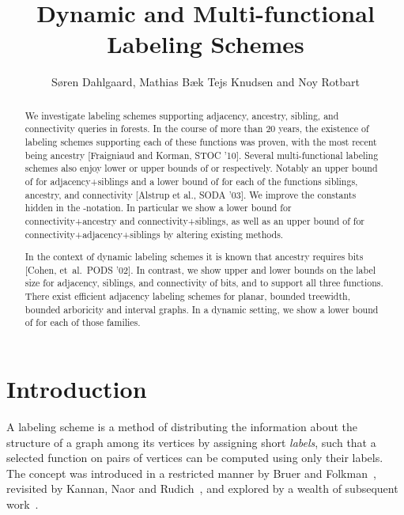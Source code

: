 \documentclass{llncs}
\begin{document}
\title{Dynamic and Multi-functional Labeling Schemes}



\author{S\o ren Dahlgaard, Mathias B\ae k Tejs Knudsen and Noy Rotbart }


\maketitle

\begin{abstract}
We investigate labeling schemes supporting  adjacency, ancestry, sibling,
and connectivity queries  in forests. 
In the course of more than 20 years, the existence of   labeling schemes supporting each of these  functions was proven, with the most recent being ancestry [Fraigniaud and Korman, STOC '10].
Several multi-functional labeling schemes also enjoy lower or upper bounds of
 or  respectively.
Notably an upper bound of  for adjacency+siblings
and a lower bound of  for each of the functions siblings, ancestry, and
connectivity [Alstrup et al., SODA '03].
We improve the constants hidden in the -notation. In particular we show a
 lower bound for connectivity+ancestry 
and connectivity+siblings, as well as an upper bound of
 for connectivity+adjacency+siblings
by altering existing methods.

In the context of dynamic labeling schemes it is known that
ancestry requires  bits [Cohen, et~al.~PODS '02]. 
In contrast, we show upper and lower bounds on the label size for adjacency, siblings, and
connectivity of  bits, and   to support all three functions.
There exist efficient adjacency labeling schemes for planar, bounded treewidth, bounded arboricity and interval graphs.
In a dynamic setting, we show a lower bound of   for each of those families.
\end{abstract}

\section{Introduction}\label{sec:intro}

A labeling scheme is a  method of distributing the information about the
structure of a graph among its vertices by assigning short \emph{labels},
such that a selected function on pairs of vertices can be computed using only their labels.
The concept  was introduced in a restricted manner by Bruer and Folkman~\cite{Breuer67}, revisited by Kannan, Naor and Rudich~\cite{Kannan92},
and explored by a wealth of subsequent work~\cite{Alstrup02,Alstrup05,Korman10,alstrup2013near,Thorup01,Peleg00}.
\end{document}
